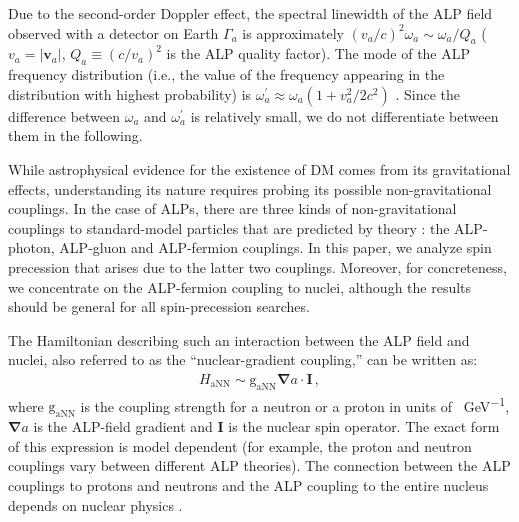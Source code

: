 Due to the second-order Doppler effect, the spectral linewidth of the ALP field observed with a detector on Earth $\Gamma_a$ is approximately $(v_a/c)^2\omega_a \sim \omega_a/Q_a$ \cite{Gramolin2022_SpectralPhysRevD} ($v_a = |\mathbf{v}_a|$, $Q_a \equiv (c/v_a)^2$ is the ALP quality factor). 
The mode of the ALP frequency distribution (i.e., the value of the frequency appearing in the distribution with highest probability) is $\omega_a^{'}\approx\omega_a(1+v_a^2/2c^2)$ \cite{KimballOverview}. Since the difference between $\omega_a$ and $\omega_a^{'}$ is relatively small, we do not differentiate between them in the following. 



While astrophysical evidence for the existence of DM comes from its gravitational effects, understanding its nature requires probing its possible non-gravitational couplings.
In the case of ALPs, there are three kinds of non-gravitational couplings to standard-model particles that are predicted by theory \cite{GrahamNewobservables_PhysRevD.88.035023}: the ALP-photon, ALP-gluon and ALP-fermion couplings.
In this paper, we analyze spin precession that arises due to the latter two couplings. Moreover, for concreteness, we concentrate on the ALP-fermion coupling to nuclei, although the results should be general for all spin-precession searches. 

The Hamiltonian describing such an interaction between the ALP field and nuclei, also referred to as the ``nuclear-gradient coupling,'' can be written as:
\begin{align}
    H_{\mathrm{aNN}} \sim \mathrm{g_{aNN}} {\boldsymbol \nabla} a \cdot \mathbf{I} 
   \,,\label{eq:HaNN}
\end{align}
where $\mathrm{g_{aNN}}$ is the coupling strength for a neutron or a proton in units of \SI{}{\GeV^{-1}}, ${\boldsymbol \nabla} a$ is the ALP-field gradient and $\mathbf{I}$ is the nuclear spin operator. The exact form of this expression is model dependent (for example, the proton and neutron couplings vary between different ALP theories). The connection between the ALP couplings to protons and neutrons and the ALP coupling to the entire nucleus depends
on nuclear physics \cite{Kimball_2015_spin}.

